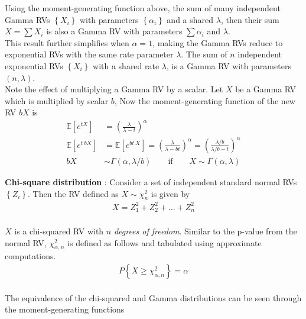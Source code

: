 Using the moment-generating function above, the sum of many independent Gamma RVs $ \left\{X_i\right\} $ with parameters $ \left\{\alpha_i\right\} $ and a shared $ \lambda $, then their sum $ X = \sum X_i $ is also a Gamma RV with parameters $ \sum \alpha_i $ and $\lambda$.\\

This result further simplifies when $ \alpha = 1 $, making the Gamma RVs reduce to exponential RVs with the same rate parameter $ \lambda $. The sum of $ n $ independent exponential RVs $ \left\{X_i\right\} $ with a shared rate $ \lambda $, is a Gamma RV with parameters $ (n, \lambda) $. \\

Note the effect of multiplying a Gamma RV by a scalar. Let $ X $ be a Gamma RV which is multiplied by scalar $ b $, Now the moment-generating function of the new RV $ bX $ is\\

\begin{align}
	\mathbb{E}[e^{tX}] &= \left(\frac{\lambda}{\lambda - t}\right)^\alpha \nonumber \\
	\mathbb{E}[e^{t\ bX}] &= \mathbb{E}[e^{bt\ X}] = \left(\frac{\lambda}{\lambda - bt}\right)^\alpha = \left(\frac{\lambda / b}{\lambda / b - t}\right)^\alpha \nonumber \\
	bX &\sim \Gamma(\alpha, \lambda / b)  \qquad \text{if} \qquad X \sim \Gamma(\alpha, \lambda)
\end{align}

\textbf{Chi-square distribution} : Consider a set of independent standard normal RVs $ \left\{Z_i\right\} $. Then the RV defined as $ X \sim \chi_n^2 $ is given by\\

\begin{align}
	X = Z_1^2 + Z_2^2 + \dots + Z_n^2
\end{align}\\

$ X $ is a chi-squared RV with $ n $ \textit{degrees of freedom}. Similar to the p-value from the normal RV, $ \chi_{\alpha, n}^2 $ is defined as follows and tabulated using approximate computations. \\

\begin{align}
	P \left\{X \geq \chi_{\alpha, n}^2 \right\} = \alpha
\end{align} \\

The equivalence of the chi-squared and Gamma distributions can be seen through the moment-generating functions \\

